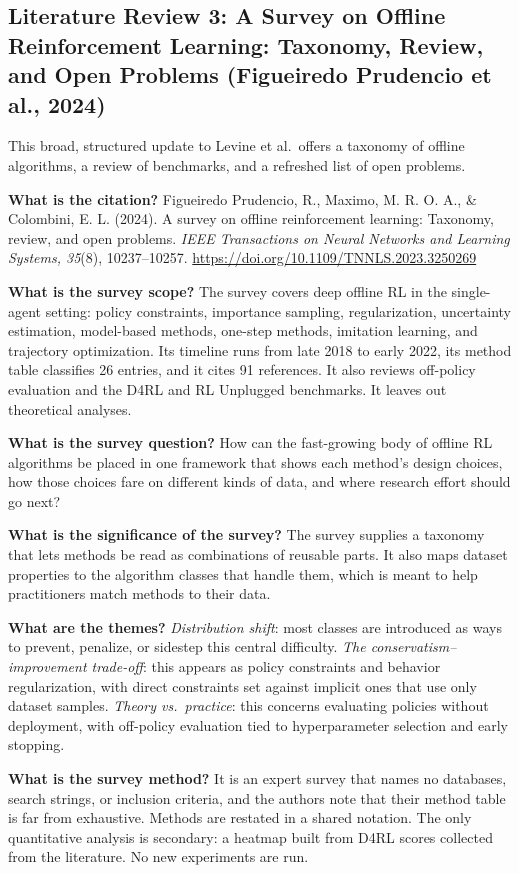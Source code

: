 \documentclass[11pt]{article}
\newcommand{\paper}[1]{\subsection*{#1}}
\newcommand{\q}[2]{\item \textbf{#1} #2}
\begin{document}
\paper{Literature Review 3: A Survey on Offline Reinforcement Learning: Taxonomy, Review, and Open Problems (Figueiredo Prudencio et al., 2024)}
This broad, structured update to Levine et al.\ offers a taxonomy of offline algorithms, a review of benchmarks, and a refreshed list of open problems.
\begin{qna}

\q{What is the citation?}
Figueiredo Prudencio, R., Maximo, M. R. O. A., \& Colombini, E. L. (2024). A survey on offline reinforcement learning: Taxonomy, review, and open problems. \emph{IEEE Transactions on Neural Networks and Learning Systems, 35}(8), 10237--10257. \url{https://doi.org/10.1109/TNNLS.2023.3250269}

\q{What is the survey scope?}
The survey covers deep offline RL in the single-agent setting: policy constraints, importance sampling, regularization, uncertainty estimation, model-based methods, one-step methods, imitation learning, and trajectory optimization. Its timeline runs from late 2018 to early 2022, its method table classifies 26 entries, and it cites 91 references. It also reviews off-policy evaluation and the D4RL and RL Unplugged benchmarks. It leaves out theoretical analyses.

\q{What is the survey question?}
How can the fast-growing body of offline RL algorithms be placed in one framework that shows each method's design choices, how those choices fare on different kinds of data, and where research effort should go next?

\q{What is the significance of the survey?}
The survey supplies a taxonomy that lets methods be read as combinations of reusable parts. It also maps dataset properties to the algorithm classes that handle them, which is meant to help practitioners match methods to their data.

\q{What are the themes?}
\emph{Distribution shift}: most classes are introduced as ways to prevent, penalize, or sidestep this central difficulty. \emph{The conservatism--improvement trade-off}: this appears as policy constraints and behavior regularization, with direct constraints set against implicit ones that use only dataset samples. \emph{Theory vs.\ practice}: this concerns evaluating policies without deployment, with off-policy evaluation tied to hyperparameter selection and early stopping.

\q{What is the survey method?}
It is an expert survey that names no databases, search strings, or inclusion criteria, and the authors note that their method table is far from exhaustive. Methods are restated in a shared notation. The only quantitative analysis is secondary: a heatmap built from D4RL scores collected from the literature. No new experiments are run.


\end{qna}
\end{document}
